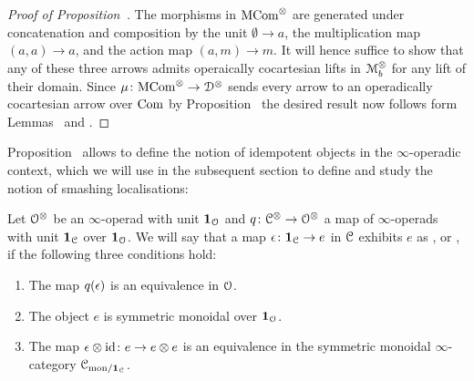 \begin{proof}[Proof of Proposition~]
The morphisms in $\mathrm{MCom}^{\otimes}$ are generated under concatenation and composition by the unit $\emptyset \to a$, the multiplication map $(a,a) \to a$, and the action map $(a,m) \to m$. It will hence suffice to show that any of these three arrows admits operaically cocartesian lifts in $\mathcal{M}_b^{\otimes}$ for any lift of their domain. Since $\mu \colon \mathrm{MCom}^\otimes \to \mathcal{D}^\otimes$ sends every arrow to an operadically cocartesian arrow over $\mathrm{Com}$ by Proposition~ the desired result now follows form Lemmas~ and .
\end{proof}



Proposition~ allows to define the notion of idempotent objects in the $\infty$-operadic context, which we will use in the subsequent section to define and study the notion of smashing localisations:
\begin{definition}
Let $\mathcal{O}^{\otimes}$ be an $\infty$-operad with unit $\mathbf{1}_{\mathcal{O}}$
and $q\colon \mathcal C^{\otimes} \to \mathcal{O}^{\otimes}$ a map of $\infty$-operads with unit 
$\mathbf{1}_{\mathcal C}$
over $\mathbf{1}_{\mathcal{O}}$. 
We will say that a map $\epsilon\colon \mathbf{1}_{\mathcal C} \to e$ in $\mathcal C$ exhibits $e$ as , or , if the following three conditions hold:
\begin{enumerate}
\item
The map $q(\epsilon)$ is an equivalence in $\mathcal{O}$.
\item
The object $e$ is symmetric monoidal over $\mathbf{1}_{\mathcal{O}}$. %
\item
The map
$\epsilon \otimes \mathrm{id}\colon e \to e \otimes e$ is an equivalence in the symmetric monoidal $\infty$-category $\mathcal C_{\mathrm{mon}/\mathbf{1}_{\mathcal C}}$.
\end{enumerate}
\end{definition}

